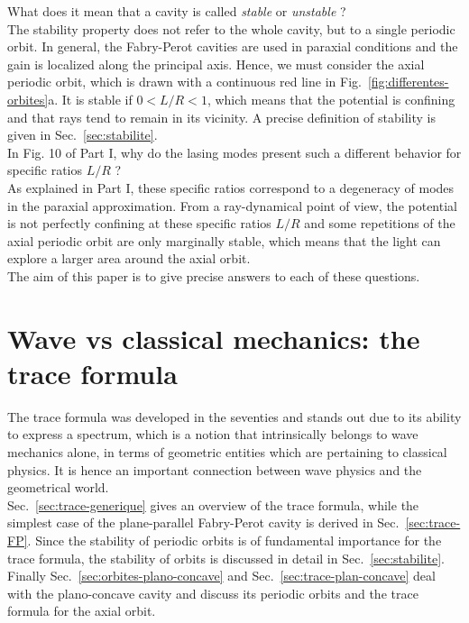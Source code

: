 \documentclass[10pt]{iopart}
\begin{document}
What does it mean that a cavity is called \emph{stable} or \emph{unstable} ?\\
The stability property does not refer to the whole cavity, but to a single periodic orbit. In general, the Fabry-Perot cavities are used in paraxial conditions and the gain is localized along the principal axis. Hence, we must consider the axial periodic orbit, which is drawn with a continuous red line in Fig.~\ref{fig:differentes-orbites}a. It is stable if $0<L/R<1$, which means that the potential is confining and that rays tend to remain in its vicinity. A precise definition of stability is given in Sec.~\ref{sec:stabilite}.\\

In Fig. 10 of Part I, why do the lasing modes present such a different behavior for specific ratios $L/R$ ?\\
As explained in Part I, these specific ratios correspond to a degeneracy of modes in the paraxial approximation. From a ray-dynamical point of view, the potential is not perfectly confining at these specific ratios $L/R$ and some repetitions of the axial periodic orbit are only marginally stable, which means that the light can explore a larger area around the axial orbit. \\

The aim of this paper is to give precise answers to each of these questions.



\section{Wave vs classical mechanics: the trace formula} \label{sec:theorie}

The trace formula was developed in the seventies \cite{balian,gutzwiller} and stands out due to its ability to express a spectrum, which is a notion that intrinsically belongs to wave mechanics alone, in terms of geometric entities which are pertaining to classical physics. It is hence an important connection between wave physics and the geometrical world.\\

Sec.~\ref{sec:trace-generique} gives an overview of the trace formula, while the simplest case of the plane-parallel Fabry-Perot cavity is derived in Sec.~\ref{sec:trace-FP}. Since the stability of periodic orbits is of fundamental importance for the trace formula, the stability of orbits is discussed in detail in  Sec.~\ref{sec:stabilite}. Finally Sec.~\ref{sec:orbites-plano-concave} and Sec.~\ref{sec:trace-plan-concave} deal with the plano-concave cavity and discuss its periodic orbits and the trace formula for the axial orbit.
\end{document}
